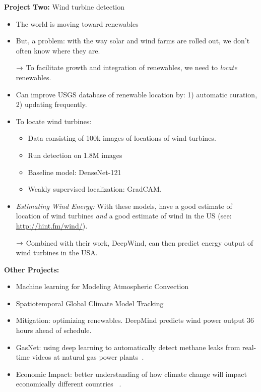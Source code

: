 {\bf Project Two:} Wind turbine detection
\begin{itemize}
    \item The world is moving toward renewables
    \item But, a problem: with the way solar and wind farms are rolled out, we don't often know where they are.
    
    $\rightarrow$ To facilitate growth and integration of renewables, we need to {\it locate} renewables.
    
    \item Can improve USGS database of renewable location by: 1) automatic curation, 2) updating frequently.
    
    \item To locate wind turbines:
    \begin{itemize}
        \item Data consisting of 100k images of locations of wind turbines.
        \item Run detection on 1.8M images
        \item Baseline model: DenseNet-121
        \item Weakly supervised localization: GradCAM.
    \end{itemize}
    \item {\it Estimating Wind Energy:} With these models, have a good estimate of location of wind turbines {\it and} a good estimate of wind in the US (see: \url{http://hint.fm/wind/}).
    
    $\rightarrow$ Combined with their work, DeepWind, can then predict energy output of wind turbines in the USA.
\end{itemize}

{\bf Other Projects:} 
\begin{itemize}
    \item Machine learning for Modeling Atmospheric Convection~\cite{o2018using}
    \item Spatiotemporal Global Climate Model Tracking
    \item Mitigation: optimizing renewables. DeepMind predicts wind power output 36 hours ahead of schedule.
    \item GasNet: using deep learning to automatically detect methane leaks from real-time videos at natural gas power plants~\cite{wang2019machine}.
    \item Economic Impact: better understanding of how climate change will impact economically different countries ~\cite{diffenbaugh2019global}.
\end{itemize}

